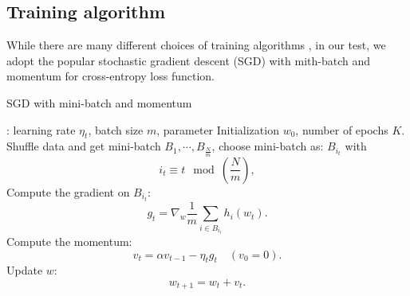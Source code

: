 \subsection{Training algorithm}
While there are many different choices of training algorithms \cite{bottou2018optimization}, 
in our test, we adopt the popular 
stochastic gradient descent (SGD) with mith-batch and momentum for
cross-entropy loss function.
\begin{breakablealgorithm}
	\caption{SGD with mini-batch and momentum}
	\label{alg:sgd}
	\begin{algorithmic}
: learning rate $\eta_t$, batch size $m$, parameter Initialization $ w_0$, number of epochs $K$. 
 \\
\State Shuffle data and get mini-batch $B_1, \cdots, B_{\frac{N}{m}}$, choose mini-batch as: $B_{i_t}$ with
$$
i_t \equiv t \mod(\frac{N}{m}),
$$
\State Compute the gradient on $B_{i_t}$:
$$
g_t = \nabla_{w} \frac{1}{m} \sum_{i \in B_{i_t}} h_i(w_{t}).
$$
\State Compute the momentum:
\begin{equation}
v_t = \alpha v_{t-1} - \eta_t g_t \quad (v_0 = 0).
\end{equation}
\State Update $w$:
\begin{equation}
w_{t+1} = w_t + v_t.
\end{equation}
\EndFor
\end{algorithmic}
\end{breakablealgorithm}

